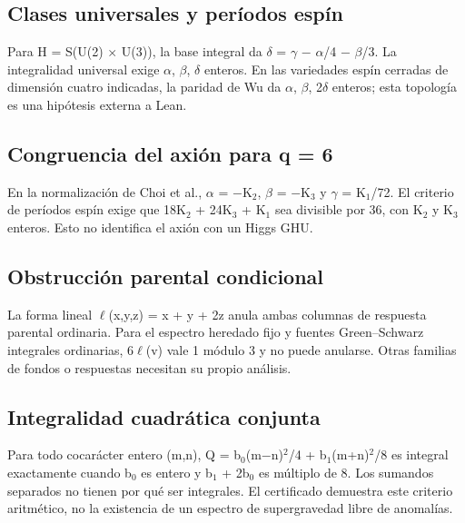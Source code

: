 \documentclass[11pt,a4paper]{article}
\begin{document}
\subsection*{Clases universales y períodos espín}
Para H = S(U(2) \ensuremath{\times} U(3)), la base integral da \ensuremath{\delta} = \ensuremath{\gamma} \ensuremath{-} \ensuremath{\alpha}/4 \ensuremath{-} \ensuremath{\beta}/3. La integralidad universal exige \ensuremath{\alpha}, \ensuremath{\beta}, \ensuremath{\delta} enteros. En las variedades espín cerradas de dimensión cuatro indicadas, la paridad de Wu da \ensuremath{\alpha}, \ensuremath{\beta}, 2\ensuremath{\delta} enteros; esta topología es una hipótesis externa a Lean.

\subsection*{Congruencia del axión para q = 6}
En la normalización de Choi et al., \ensuremath{\alpha} = \ensuremath{-}K\ensuremath{{}_{2}}, \ensuremath{\beta} = \ensuremath{-}K\ensuremath{{}_{3}} y \ensuremath{\gamma} = K\ensuremath{{}_{1}}/72. El criterio de períodos espín exige que 18K\ensuremath{{}_{2}} + 24K\ensuremath{{}_{3}} + K\ensuremath{{}_{1}} sea divisible por 36, con K\ensuremath{{}_{2}} y K\ensuremath{{}_{3}} enteros. Esto no identifica el axión con un Higgs GHU.

\subsection*{Obstrucción parental condicional}
La forma lineal \ensuremath{\ell}(x,y,z) = x + y + 2z anula ambas columnas de respuesta parental ordinaria. Para el espectro heredado fijo y fuentes Green--Schwarz integrales ordinarias, 6\ensuremath{\ell}(v) vale 1 módulo 3 y no puede anularse. Otras familias de fondos o respuestas necesitan su propio análisis.

\subsection*{Integralidad cuadrática conjunta}
Para todo cocarácter entero (m,n), Q = b\ensuremath{{}_{0}}(m\ensuremath{-}n)\ensuremath{{}^{2}}/4 + b\ensuremath{{}_{1}}(m+n)\ensuremath{{}^{2}}/8 es integral exactamente cuando b\ensuremath{{}_{0}} es entero y b\ensuremath{{}_{1}} + 2b\ensuremath{{}_{0}} es múltiplo de 8. Los sumandos separados no tienen por qué ser integrales. El certificado demuestra este criterio aritmético, no la existencia de un espectro de supergravedad libre de anomalías.
\end{document}
